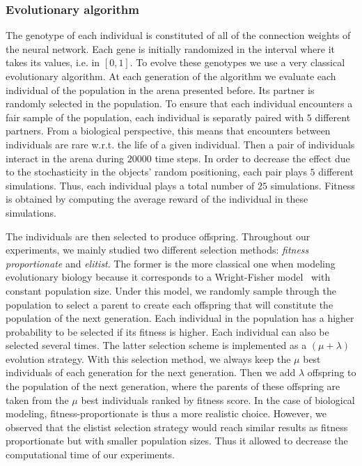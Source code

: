     \subsubsection{Evolutionary algorithm} The genotype of each individual is constituted of all of the connection weights of the neural network. Each gene is initially randomized in the interval where it takes its values, i.e. in \([0,1]\). To evolve these genotypes we use a very classical evolutionary algorithm. At each generation of the algorithm we evaluate each individual of the population in the arena presented before. Its partner is randomly selected in the population. To ensure that each individual encounters a fair sample of the population, each individual is separatly paired with $5$ different partners. From a biological perspective, this means that encounters between individuals are rare w.r.t. the life of a given individual. Then a pair of individuals interact in the arena during $20000$ time steps. In order to decrease the effect due to the stochasticity in the objects' random positioning, each pair plays $5$ different simulations. Thus, each individual plays a total number of $25$ simulations. Fitness is obtained by computing the average reward of the individual in these simulations.

    The individuals are then selected to produce offspring. Throughout our experiments, we mainly studied two different selection methods: \emph{fitness proportionate} and \emph{elitist}. The former is the more classical one when modeling evolutionary biology because it corresponds to a Wright-Fisher model~\parencite{Wright1931} with constant population size. Under this model, we randomly sample through the population to select a parent to create each offspring that will constitute the population of the next generation. Each individual in the population has a higher probability to be selected if its fitness is higher. Each individual can also be selected several times. The latter selection scheme is implemented as a \((\mu + \lambda)\) evolution strategy. With this selection method, we always keep the $\mu$ best individuals of each generation for the next generation. Then we add $\lambda$ offspring to the population of the next generation, where the parents of these offspring are taken from the $\mu$ best individuals ranked by fitness score. In the case of biological modeling, fitness-proportionate is thus a more realistic choice. However, we observed that the elistist selection strategy would reach similar results as fitness proportionate but with smaller population sizes. Thus it allowed to decrease the computational time of our experiments.

